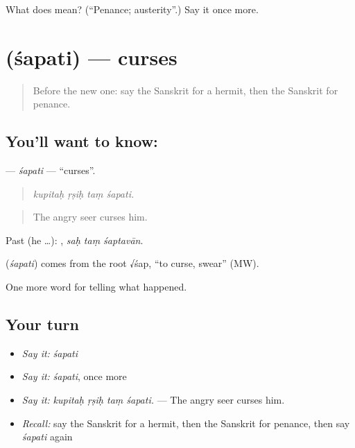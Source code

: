 \begin{tcolorbox}[breakable,colback=teal!4,colframe=teal!35!black,title={Before you move on}]
What does  mean? (\textquotedblleft{}Penance; austerity\textquotedblright{}.) Say it once more.
\end{tcolorbox}
\section[\texorpdfstring{\sk{शपति} (śapati)}{शपति (śapati)}]{ (śapati) — curses}

\label{lesson:SA-C332-sapati}



\begin{quote}
Before the new one: say the Sanskrit for a hermit, then the Sanskrit for penance.
\end{quote}

\subsection*{You'll want to know: }
\textbf{} — \emph{śapati} — \textquotedblleft{}curses\textquotedblright{}.

\begin{quote}
   
\end{quote}

\begin{quote}
\emph{kupitaḥ ṛṣiḥ taṃ śapati.}
\end{quote}

\begin{quote}
The angry seer curses him.
\end{quote}

Past (he …):   , \emph{saḥ taṃ śaptavān}.

\begin{cousinweb}
\textbf{} (\emph{śapati}) comes from the root √śap, \textquotedblleft{}to curse, swear\textquotedblright{} (MW).
\end{cousinweb}

\begin{grammarlens}[title={What you've built}]
One more word for telling what happened.
\end{grammarlens}

\subsection*{Your turn}
\begin{itemize}
\raggedright
  \item \emph{Say it:} \emph{śapati}
  \item \emph{Say it:} \emph{śapati}, once more
  \item \emph{Say it:} \emph{kupitaḥ ṛṣiḥ taṃ śapati.} — The angry seer curses him.
  \item \emph{Recall:} say the Sanskrit for a hermit, then the Sanskrit for penance, then say \emph{śapati} again
\end{itemize}

